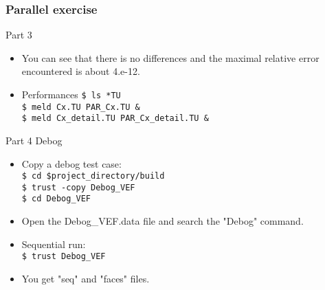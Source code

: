 \documentclass[10pt, hyperref={unicode=true,pdfusetitle, bookmarks=true,bookmarksnumbered=false,bookmarksopen=false, breaklinks=false,pdfborder={0 0 1},backref=true,colorlinks=true,linkcolor=darkblue,pageanchor, urlcolor=darkblue}]{beamer}
\begin{document}
\begin{frame}
\frametitle{Parallel exercise}

\begin{block}{Part 3}
\begin{itemize}
\item You can see that there is no differences and the maximal relative error encountered is about 4.e-12.
\item Performances
\texttt{\$ ls *TU }\\
\texttt{\$ meld Cx.TU PAR\_Cx.TU \& }\\
\texttt{\$ meld Cx\_detail.TU PAR\_Cx\_detail.TU \& }\\
\end{itemize}
\end{block}


\begin{block}{Part 4 Debog}
\begin{itemize}
\item Copy a debog test case:\\
\texttt{\$ cd \$project\_directory/build }\\
\texttt{\$ trust -copy Debog\_VEF }\\
\texttt{\$ cd Debog\_VEF }\\
\item Open the Debog\_VEF.data file and search the "Debog" command.
\item Sequential run:\\
\texttt{\$ trust Debog\_VEF }\\
\item You get "seq" and "faces" files.

\end{itemize}
\end{block}

\end{frame}
\end{document}
